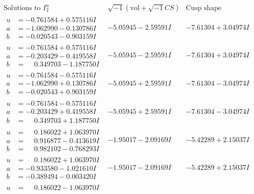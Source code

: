 \documentclass[1p]{elsarticle_modified}
\theoremstyle{definition}
\newcommand{\I}{\sqrt{-1}}
\begin{document}
$$\begin{array}{c|c|c}  
\text{Solutions to }I^u_{2}& \I (\text{vol} + \sqrt{-1}CS) & \text{Cusp shape}\\
 \hline 
\begin{aligned}
u &= -0.761584 + 0.575116 I \\
a &= -1.062990 - 0.130786 I \\
b &= -0.020543 - 0.903159 I\end{aligned}
 & -5.05945 - 2.59591 I & -7.61304 + 3.04974 I \\ \hline\begin{aligned}
u &= -0.761584 + 0.575116 I \\
a &= -0.203429 - 0.419558 I \\
b &= \phantom{-}0.349703 - 1.187750 I\end{aligned}
 & -5.05945 - 2.59591 I & -7.61304 + 3.04974 I \\ \hline\begin{aligned}
u &= -0.761584 - 0.575116 I \\
a &= -1.062990 + 0.130786 I \\
b &= -0.020543 + 0.903159 I\end{aligned}
 & -5.05945 + 2.59591 I & -7.61304 - 3.04974 I \\ \hline\begin{aligned}
u &= -0.761584 - 0.575116 I \\
a &= -0.203429 + 0.419558 I \\
b &= \phantom{-}0.349703 + 1.187750 I\end{aligned}
 & -5.05945 + 2.59591 I & -7.61304 - 3.04974 I \\ \hline\begin{aligned}
u &= \phantom{-}0.186022 + 1.063970 I \\
a &= \phantom{-}0.916877 - 0.413619 I \\
b &= \phantom{-}0.982102 - 0.768293 I\end{aligned}
 & -1.95017 - 2.09169 I & -5.42289 + 2.15037 I \\ \hline\begin{aligned}
u &= \phantom{-}0.186022 + 1.063970 I \\
a &= -0.933580 - 1.021610 I \\
b &= -0.389494 - 0.003420 I\end{aligned}
 & -1.95017 - 2.09169 I & -5.42289 + 2.15037 I \\ \hline\begin{aligned}
u &= \phantom{-}0.186022 - 1.063970 I \\

\end{aligned}
\end{array}$$
\end{document}
